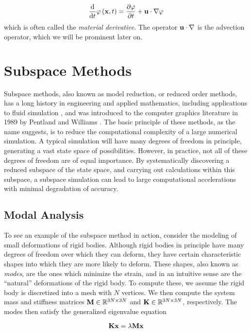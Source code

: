 \begin{equation}
\frac{\mathrm{d}}{\mathrm{d}t}\varphi\left(\mathbf{x}, t\right) = \frac{\partial \varphi}{\partial t} + \mathbf{u} \cdot \nabla \varphi
\end{equation}
which is often called the {\em material derivative}. The operator $\mathbf{u} \cdot \nabla$ is the advection operator, which we will be prominent later on.

\section{Subspace Methods}
Subspace methods, also known as model reduction, or reduced order methods, has a long history in engineering and applied mathematics, including applications to fluid simulation \cite{lumley1967}, and was introduced to the computer graphics literature in 1989 by Pentland and Williams \cite{Pentland:1989:GVM, Berkooz93theproper}. The basic principle of these methods, as the name suggests, is to reduce the computational complexity of a large numerical simulation. A typical simulation will have many degrees of freedom in principle, generating a vast state space of possibilities. However, in practice, not all of these degrees of freedom are of equal importance. By systematically discovering a reduced subspace of the state space, and carrying out calculations within this subspace, a subspace simulation can lead to large computational accelerations with minimal degradation of accuracy.

\subsection{Modal Analysis}
To see an example of the subspace method in action, consider the modeling of small deformations of rigid bodies. Although rigid bodies in principle have many degrees of freedom over which they can deform, they have certain characteristic shapes into which they are more likely to deform. These shapes, also known as {\em modes}, are the ones which minimize the strain, and in an intuitive sense are the ``natural'' deformations of the rigid body. To compute these, we assume the rigid body is discretized into a mesh with $N$ vertices. We then compute the system mass and stiffness matrices $\mathbf{M} \in \mathbb{R}^{3N \times 3N}$ and $\mathbf{K} \in \mathbb{R}^{3N \times 3N}$, respectively. The modes then satisfy the generalized eigenvalue equation

\begin{equation}
	\mathbf{K} \mathbf{x} = \lambda \mathbf{M} \mathbf{x}
\end{equation}

